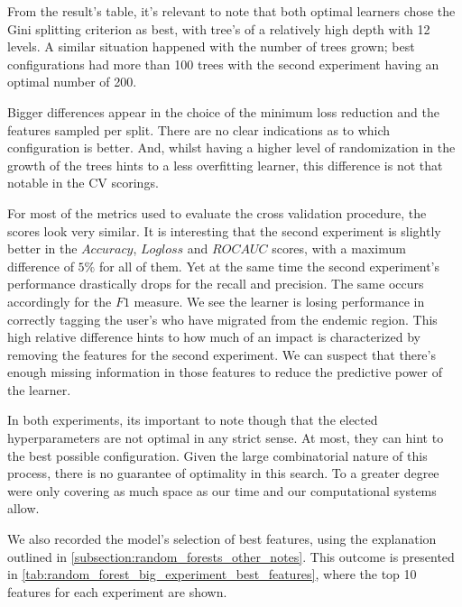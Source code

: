 From the result's table, it's relevant to note that both optimal learners chose the Gini splitting criterion as best, with tree's of a relatively high depth with 12 levels.
A similar situation happened with the number of trees grown; best configurations had more than 100 trees with the second experiment having an optimal number of 200.

Bigger differences appear in the choice of the minimum loss reduction and the features sampled per split.
There are no clear indications as to which configuration is better.
And, whilst having a higher level of randomization in the growth of the trees hints to a less overfitting learner, this difference is not that notable in the CV scorings.

For most of the metrics used to evaluate the cross validation procedure, the scores look very similar.
It is interesting that the second experiment is slightly better in the $Accuracy$, $Logloss$ and $ROC AUC$ scores, with a maximum difference of $5\%$ for all of them.
Yet at the same time the second experiment's performance drastically drops for the recall and precision.
The same occurs accordingly for the $F1$ measure.
We see the learner is losing performance in correctly tagging the user's who have migrated from the endemic region.
This high relative difference hints to how much of an impact is characterized by removing the features for the second experiment.
We can suspect that there's enough missing information in those features to reduce the predictive power of the learner.

In both experiments, its important to note though that the elected hyperparameters are not optimal in any strict sense.
At most, they can hint to the best possible configuration.
Given the large combinatorial nature of this process, there is no guarantee of optimality in this search.
To a greater degree were only covering as much space as our time and our computational systems allow.


We also recorded the model's selection of best features, using the explanation outlined in \cref{subsection:random_forests_other_notes}.
This outcome is presented in \cref{tab:random_forest_big_experiment_best_features}, where the top 10 features for each experiment are shown.

